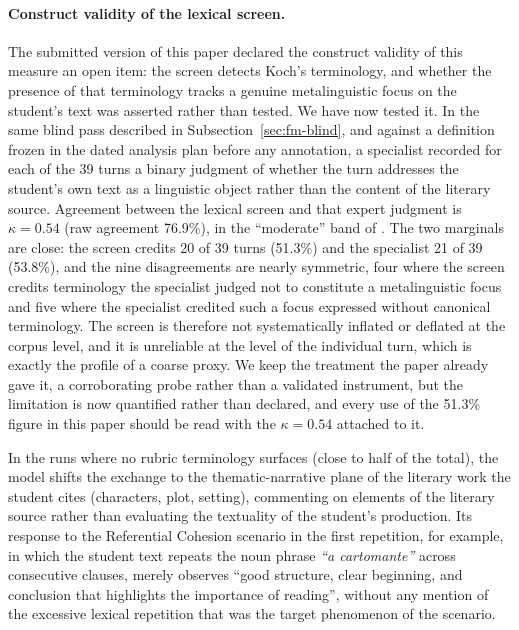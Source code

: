 \documentclass{sbc2023}%
\begin{document}
\paragraph{Construct validity of the lexical screen.} The submitted version of this paper declared the construct validity of this measure an open item: the screen detects Koch's terminology, and whether the presence of that terminology tracks a genuine metalinguistic focus on the student's text was asserted rather than tested. We have now tested it. In the same blind pass described in Subsection~\ref{sec:fm-blind}, and against a definition frozen in the dated analysis plan before any annotation, a specialist recorded for each of the 39 turns a binary judgment of whether the turn addresses the student's own text as a linguistic object rather than the content of the literary source. Agreement between the lexical screen and that expert judgment is $\kappa = 0.54$ (raw agreement 76.9\%), in the ``moderate'' band of \citet{landis1977measurement}. The two marginals are close: the screen credits 20 of 39 turns (51.3\%) and the specialist 21 of 39 (53.8\%), and the nine disagreements are nearly symmetric, four where the screen credits terminology the specialist judged not to constitute a metalinguistic focus and five where the specialist credited such a focus expressed without canonical terminology. The screen is therefore not systematically inflated or deflated at the corpus level, and it is unreliable at the level of the individual turn, which is exactly the profile of a coarse proxy. We keep the treatment the paper already gave it, a corroborating probe rather than a validated instrument, but the limitation is now quantified rather than declared, and every use of the 51.3\% figure in this paper should be read with the $\kappa = 0.54$ attached to it.

In the runs where no rubric terminology surfaces (close to half of the total), the model shifts the exchange to the thematic-narrative plane of the literary work the student cites (characters, plot, setting), commenting on elements of the literary source rather than evaluating the textuality of the student's production. Its response to the Referential Cohesion scenario in the first repetition, for example, in which the student text repeats the noun phrase \textit{``a cartomante''} across consecutive clauses, merely observes ``good structure, clear beginning, and conclusion that highlights the importance of reading'', without any mention of the excessive lexical repetition that was the target phenomenon of the scenario.
\end{document}

